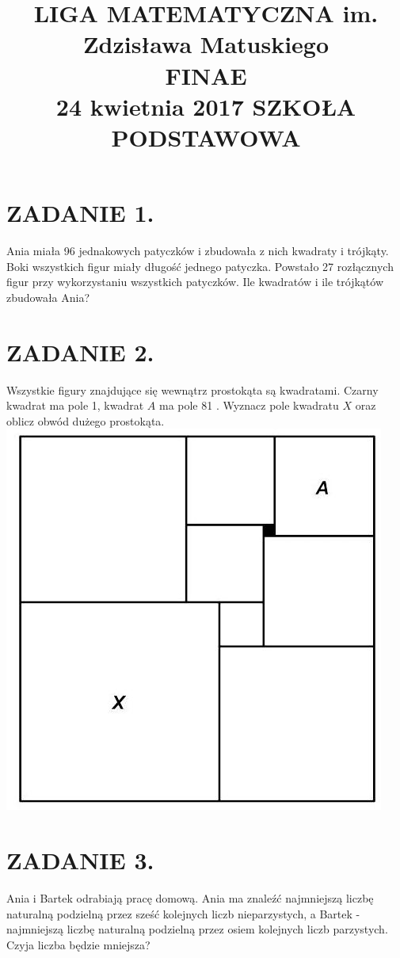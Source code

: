\documentclass[10pt]{article}
\title{LIGA MATEMATYCZNA im. Zdzisława Matuskiego \\
 FINAE \\
 24 kwietnia 2017 SZKOŁA PODSTAWOWA }
\author{}
\date{}
\begin{document}
\maketitle
\section*{ZADANIE 1.}
Ania miała 96 jednakowych patyczków i zbudowała z nich kwadraty i trójkąty. Boki wszystkich figur miały długość jednego patyczka. Powstało 27 rozłącznych figur przy wykorzystaniu wszystkich patyczków. Ile kwadratów i ile trójkątów zbudowała Ania?

\section*{ZADANIE 2.}
Wszystkie figury znajdujące się wewnątrz prostokąta są kwadratami. Czarny kwadrat ma pole 1, kwadrat \(A\) ma pole 81 . Wyznacz pole kwadratu \(X\) oraz oblicz obwód dużego prostokąta.\\
\includegraphics[max width=\textwidth, center]{2024_11_21_14af575c41c1c56d2472g-1}

\section*{ZADANIE 3.}
Ania i Bartek odrabiają pracę domową. Ania ma znaleźć najmniejszą liczbę naturalną podzielną przez sześć kolejnych liczb nieparzystych, a Bartek - najmniejszą liczbę naturalną podzielną przez osiem kolejnych liczb parzystych. Czyja liczba będzie mniejsza?
\end{document}
